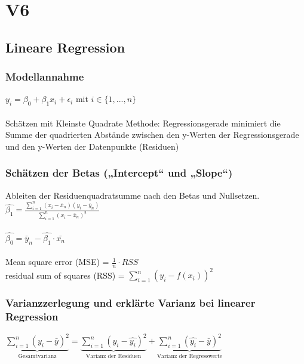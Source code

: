 \section{V6}
\subsection{Lineare Regression}
\subsubsection{Modellannahme}
$y_i = \beta_0 + \beta_1 x_i + \epsilon_i$ mit $i \in \{1, ... , n\}$\\\\
Schätzen mit Kleinste Quadrate Methode: Regressionsgerade minimiert die Summe der quadrierten Abstände zwischen den y-Werten der Regressionsgerade und den y-Werten der Datenpunkte (Residuen)

\subsubsection{Schätzen der Betas („Intercept“ und „Slope“)}
Ableiten der Residuenquadratsumme nach den Betas und Nullsetzen.\\
$\hat{\beta_1}=\frac{\displaystyle \sum_{i=1}^{n} (x_i - \bar{x}_n)(y_i - \bar{y}_n)}{\displaystyle \sum_{i=1}^{n} (x_i - \bar{x}_n)^2}$\\\\
$\hat{\beta_0}= \bar{y}_n - \hat{\beta_1} \cdot \bar{x_n}$\\\\

Mean square error (MSE) = $\frac{1}{n} \cdot RSS$\\
residual sum of squares (RSS) = $\displaystyle \sum_{i=1}^{n} (y_i - f(x_i))^2$

\subsubsection{Varianzzerlegung und erklärte Varianz bei linearer Regression}
$\displaystyle \underbrace{\sum_{i=1}^{n} (y_i - \bar{y})^2}_{\text{Gesamtvarianz}} = \displaystyle \underbrace{\sum_{i=1}^{n} (y_i - \hat{y_i})^2}_{\text{Varianz der Residuen}} + \displaystyle \underbrace{\sum_{i=1}^{n} (\hat{y_i} - \bar{y})^2}_{\text{Varianz der Regresswerte}}$

